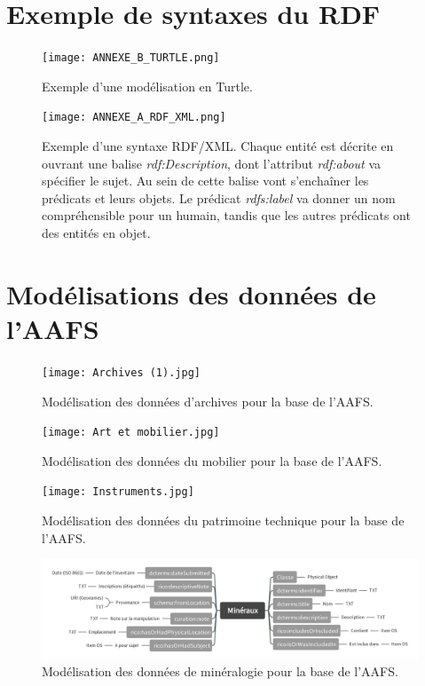 \documentclass[a4paper,12pt,twoside]{book}
\begin{document}
        
	\chapter{Exemple de syntaxes du RDF}\label{annexe-syntaxes}
 \begin{figure}[h]
    \centering
    \texttt{[image: ANNEXE\_B\_TURTLE.png]}
    \caption{Exemple d'une modélisation en Turtle. }
    \label{fig:enter-label}
\end{figure}

 \begin{figure}[h]
    \centering
    \texttt{[image: ANNEXE\_A\_RDF\_XML.png]}
    \caption{Exemple d'une syntaxe RDF/XML. Chaque entité est décrite en ouvrant une balise \textit{rdf:Description}, dont l'attribut \textit{rdf:about} va spécifier le sujet. Au sein de cette balise vont s'enchaîner les prédicats et leurs objets. Le prédicat \textit{rdfs:label} va donner un nom compréhensible pour un humain, tandis que les autres prédicats ont des entités en objet.}
    \label{fig:enter-label}
\end{figure}

	\chapter{Modélisations des données de l'AAFS}\label{modelisations-AAFS}
 \begin{figure}[h]
    \centering
    \texttt{[image: Archives (1).jpg]}
    \caption{Modélisation des données d'archives pour la base de l'AAFS.}
    \label{fig:enter-label}
\end{figure}

 \begin{figure}[h]
    \centering
    \texttt{[image: Art et mobilier.jpg]}
    \caption{Modélisation des données du mobilier pour la base de l'AAFS.}
    \label{fig:enter-label}
\end{figure}



 \begin{figure}[h]
    \centering
    \texttt{[image: Instruments.jpg]}
    \caption{Modélisation des données du patrimoine technique pour la base de l'AAFS.}
    \label{fig:enter-label}
\end{figure}

 \begin{figure}[h]
    \centering
    \includegraphics[width=16cm]{Minéraux.jpg}
    \caption{Modélisation des données de minéralogie pour la base de l'AAFS.}
    \label{fig:enter-label}
\end{figure}
\end{document}
